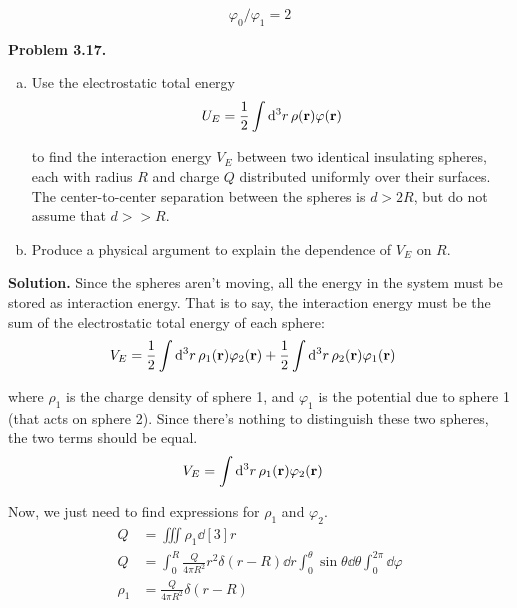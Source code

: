 \documentclass{article}
\begin{document}
\begin{equation}
	\boxed{\varphi _0/\varphi _1 = 2}\tag{3.13}\label{eq:3.13}
\end{equation}

\hrulefill

\textbf{Problem 3.17.} 
\begin{enumerate}[(a)]
\item Use the electrostatic total energy
\[
\begin{aligned}
	U_E = \frac{1}{2}\int \dd[3]{r} \rho(\vb{r})\varphi (\vb{r})
\end{aligned}
\]

 to find the interaction energy $V_E$ between two identical insulating spheres, each with radius $R$ and charge $Q$ distributed uniformly over their surfaces. The center-to-center separation between the spheres is $d > 2R$, but do not assume that $d >\!\! > R$.
\item Produce a physical argument to explain the dependence of $V_E$ on $R$.
\end{enumerate}

\textbf{Solution.} Since the spheres aren't moving, all the energy in the system must be stored as interaction energy. That is to say, the interaction energy must be the sum of the electrostatic total energy of each sphere:
\[
\begin{aligned}
	V_E &= \frac{1}{2}\int \dd[3]{r} \rho_1(\vb{r})\varphi_2 (\vb{r}) + \frac{1}{2}\int \dd[3]{r} \rho_2(\vb{r})\varphi_1 (\vb{r})
\end{aligned}
\]

where $\rho_1$ is the charge density of sphere 1, and $\varphi_1$ is the potential due to sphere 1 (that acts on sphere 2). Since there's nothing to distinguish these two spheres, the two terms should be equal.
\[
\begin{aligned}
	V_E &= \int \dd[3]{r} \rho_1(\vb{r})\varphi_2 (\vb{r})
\end{aligned}
\]


Now, we just need to find expressions for $\rho_1$ and $\varphi_2$.
\[
\begin{aligned}
	Q &= \iiint \rho_1\dd[3]{r} \\
	Q &= \int_0^R \frac{Q}{4\pi R^2}r^2\delta(r-R)\dd{r}\int_0^\theta \sin\theta\dd{\theta} \int_0^{2\pi}\dd{\varphi} \\
	\rho_1 &= \frac{Q}{4\pi R^2}\delta(r-R)
\end{aligned}
\]
\end{document}
